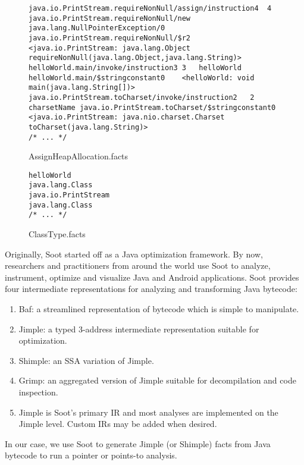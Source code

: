 \documentclass{dithesis}
\begin{document}
        \begin{figure}[H]
\begin{lstlisting}
java.io.PrintStream.requireNonNull/assign/instruction4  4   java.io.PrintStream.requireNonNull/new java.lang.NullPointerException/0 java.io.PrintStream.requireNonNull/$r2  <java.io.PrintStream: java.lang.Object requireNonNull(java.lang.Object,java.lang.String)>
helloWorld.main/invoke/instruction3 3   helloWorld  helloWorld.main/$stringconstant0    <helloWorld: void main(java.lang.String[])>
java.io.PrintStream.toCharset/invoke/instruction2   2   charsetName java.io.PrintStream.toCharset/$stringconstant0  <java.io.PrintStream: java.nio.charset.Charset toCharset(java.lang.String)>
/* ... */
\end{lstlisting}
\caption{AssignHeapAllocation.facts}
        \end{figure}



        \begin{figure}[H]
\begin{lstlisting}
helloWorld
java.lang.Class
java.io.PrintStream
java.lang.Class
/* ... */
\end{lstlisting}
\caption{ClassType.facts}
        \end{figure}


    Originally, Soot started off as a Java optimization framework. By now, researchers and practitioners from around the world use Soot to analyze, instrument, optimize and visualize Java and Android applications. Soot provides four intermediate representations for analyzing and transforming Java bytecode:
	\begin{enumerate}
		\item Baf: a streamlined representation of bytecode which is simple to manipulate.
		\item Jimple: a typed 3-address intermediate representation suitable for optimization.
		\item Shimple: an SSA variation of Jimple.
		\item Grimp: an aggregated version of Jimple suitable for decompilation and code inspection.
		\item Jimple is Soot’s primary IR and most analyses are implemented on the Jimple level. Custom IRs may be added when desired.
	\end{enumerate}
    In our case, we use Soot to generate Jimple (or Shimple) facts from Java bytecode to run a pointer or points-to analysis.
    \cite{Sable: Soot}
\end{document}
